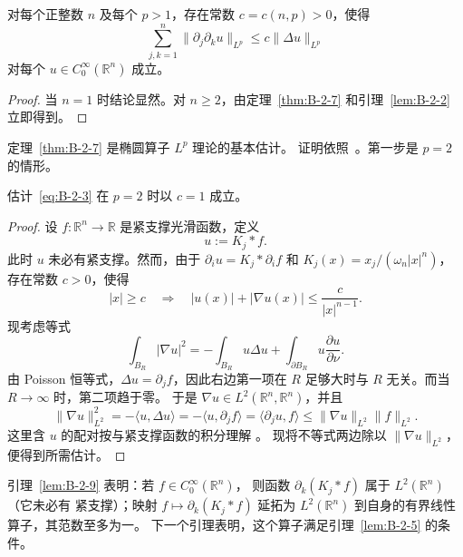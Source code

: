 \begin{corollary}\label{cor:B-2-8}
对每个正整数 $n$ 及每个 $p>1$，存在常数 $c=c(n,p)>0$，使得
\[
  \sum_{j,k=1}^n\|\partial_j\partial_k u\|_{L^p}
  \le c\|\Delta u\|_{L^p}
\]
对每个 $u\in C_0^\infty(\mathbb R^n)$ 成立。
\end{corollary}

\begin{proof}
当 $n=1$ 时结论显然。对 $n\ge2$，由定理~\ref{thm:B-2-7}
和引理~\ref{lem:B-2-2} 立即得到。
\end{proof}

定理~\ref{thm:B-2-7} 是椭圆算子 $L^p$ 理论的基本估计。
证明依照~。第一步是 $p=2$ 的情形。

\begin{lemma}\label{lem:B-2-9}
估计~\eqref{eq:B-2-3} 在 $p=2$ 时以 $c=1$ 成立。
\end{lemma}

\begin{proof}
设 $f:\mathbb R^n\to\mathbb R$ 是紧支撑光滑函数，定义
\[
  u:=K_j*f.
\]
此时 $u$ 未必有紧支撑。然而，由于
$\partial_i u=K_j*\partial_i f$
 和
$K_j(x)=x_j/(\omega_n|x|^n)$，存在常数 $c>0$，使得
\[
  |x|\ge c\quad\Longrightarrow\quad
  |u(x)|+|\nabla u(x)|\le\frac{c}{|x|^{n-1}}.
\]
现考虑等式
\[
  \int_{B_R}|\nabla u|^2
  =-\int_{B_R}u\Delta u+\int_{\partial B_R}u\frac{\partial u}{\partial\nu}.
\]
由 Poisson 恒等式，$\Delta u=\partial_jf$，因此右边第一项在
$R$ 足够大时与 $R$ 无关。而当 $R\to\infty$ 时，第二项趋于零。
于是 $\nabla u\in L^2(\mathbb R^n,\mathbb R^n)$，并且
\[
  \|\nabla u\|_{L^2}^2
  =-\langle u,\Delta u\rangle
  =-\langle u,\partial_jf\rangle
  =\langle\partial_j u,f\rangle
  \le\|\nabla u\|_{L^2}\|f\|_{L^2}.
\]
这里含 $u$ 的配对按与紧支撑函数的积分理解
。
现将不等式两边除以
$\|\nabla u\|_{L^2}$，便得到所需估计。
\end{proof}

引理~\ref{lem:B-2-9} 表明：若 $f\in C_0^\infty(\mathbb R^n)$，
则函数 $\partial_k(K_j*f)$ 属于 $L^2(\mathbb R^n)$（它未必有
紧支撑）；映射 $f\mapsto\partial_k(K_j*f)$ 延拓为
$L^2(\mathbb R^n)$ 到自身的有界线性算子，其范数至多为一。
下一个引理表明，这个算子满足引理~\ref{lem:B-2-5} 的条件。


